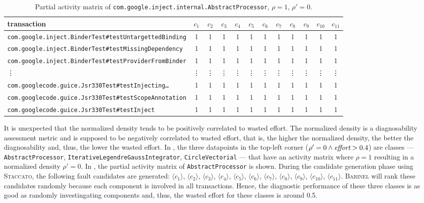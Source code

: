\documentclass[twoside,a4paper,11pt]{memoir}
\begin{document}
\begin{table}[]
    \scriptsize
    \centering
    \caption{Partial activity matrix of \texttt{com.google.inject.internal.AbstractProcessor}, \(\rho = 1 \), \(\rho' = 0 \).}%
    \label{tab:abstractprocessor}
    \begin{adjustbox}{center}
    \begin{tabular}{l|ccccccccccc}
    transaction & \(c_1 \) & \(c_2 \) & \(c_3 \) & \(c_4 \) & \(c_5 \) & \(c_6 \) & \(c_7 \) & \(c_8 \) & \(c_9 \) & \(c_{10} \) & \(c_{11} \) \\ \hline
    \texttt{com.google.inject.BinderTest\#testUntargettedBinding} & 1 & 1 & 1 & 1 & 1 & 1 & 1 & 1 & 1 & 1 & 1 \\
    \texttt{com.google.inject.BinderTest\#testMissingDependency} & 1 & 1 & 1 & 1 & 1 & 1 & 1 & 1 & 1 & 1 & 1 \\
    \texttt{com.google.inject.BinderTest\#testProviderFromBinder} & 1 & 1 & 1 & 1 & 1 & 1 & 1 & 1 & 1 & 1 & 1 \\
    \vdots & \vdots & \vdots & \vdots & \vdots & \vdots & \vdots & \vdots & \vdots & \vdots & \vdots & \vdots \\
    \texttt{com.googlecode.guice.Jsr330Test\#testInjecting\dots} & 1 & 1 & 1 & 1 & 1 & 1 & 1 & 1 & 1 & 1 & 1 \\
    \texttt{com.googlecode.guice.Jsr330Test\#testScopeAnnotation} & 1 & 1 & 1 & 1 & 1 & 1 & 1 & 1 & 1 & 1 & 1 \\
    \texttt{com.googlecode.guice.Jsr330Test\#testInject} & 1 & 1 & 1 & 1 & 1 & 1 & 1 & 1 & 1 & 1 & 1 \\
    \end{tabular}
    \end{adjustbox}
\end{table}

It is unexpected that the normalized density tends to be positively correlated to wasted effort.
The normalized density is a diagnosability assessment metric and is supposed to be negatively correlated to wasted effort, that is, the higher the normalized density, the better the diagnosability and, thus, the lower the wasted effort.
In , the three datapoints in the top-left corner (\(\rho' = 0 \wedge \emph{effort} > 0.4\)) are classes --- \texttt{Abstract\-Processor}, \texttt{Iterative\-Legendre\-Gauss\-Integrator}, \texttt{Circle\-Vectorial} --- that have an activity matrix where \(\rho = 1\) resulting in a normalized density \(\rho' = 0\).
In , the partial activity matrix of \texttt{AbstractProcessor} is shown.
During the candidate generation phase using \textsc{Staccato}, the following fault candidates are generated: \(\langle c_1 \rangle \), \(\langle c_2 \rangle \), \(\langle c_3 \rangle \), \(\langle c_4 \rangle \), \(\langle c_5 \rangle \), \(\langle c_6 \rangle \), \(\langle c_7 \rangle \), \(\langle c_8 \rangle \), \(\langle c_9 \rangle \), \(\langle c_{10} \rangle \), \(\langle c_{11} \rangle \).
\textsc{Barinel} will rank these candidates randomly because each component is involved in all transactions.
Hence, the diagnostic performance of these three classes is as good as randomly investingating components and, thus, the wasted effort for these classes is around 0.5.
\end{document}
